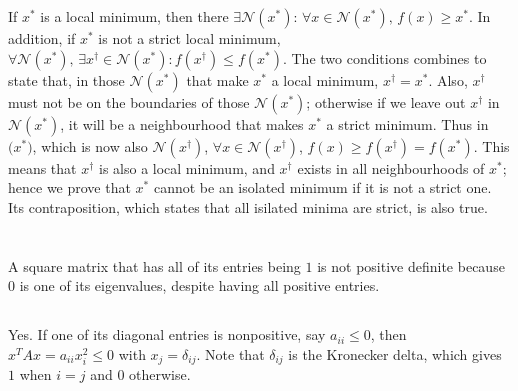 \documentclass[11pt]{article}
\begin{document}
\section{}
If $x^*$ is a local minimum, then there $\exists\mathcal{N}(x^*):\,\forall x \in\mathcal{N}(x^*),\,f(x)\geq x^*$. In addition, if $x^*$ is not a strict local minimum, $\forall \mathcal{N}(x^*),\,\exists x^\dagger\in\mathcal{N}(x^*):f(x^\dagger)\leq f(x^*) $. The two conditions combines to state that, in those $\mathcal{N}(x^*)$ that make $x^*$ a local minimum, $x^\dagger=x^*$. Also, $x^\dagger$ must not be on the boundaries of those $\mathcal{N}(x^*)$; otherwise if we leave out $x^\dagger$ in $\mathcal{N}(x^*)$, it will be a neighbourhood that makes $x^*$ a strict minimum. Thus in $\mathcal(x^*)$, which is now also $\mathcal{N}(x^\dagger)$, $\forall x\in\mathcal{N}(x^\dagger)$, $f(x) \geq f(x^\dagger)=f(x^*)$. This means that $x^\dagger$ is also a local minimum, and $x^\dagger$ exists in all neighbourhoods of $x^*$; hence we prove that $x^*$ cannot be an isolated minimum if it is not a strict one. Its contraposition, which states that all isilated minima are strict, is also true.

\section{}
\subsection{}
A square matrix that has all of its entries being $1$ is not positive definite because $0$ is one of its eigenvalues, despite having all positive entries.
\subsection{}
Yes. If one of its diagonal entries is nonpositive, say $a_{ii}\leq0$, then $x^TAx=a_{ii}x_i^2\leq0$ with $x_j=\delta_{ij}$. Note that $\delta_{ij}$ is the Kronecker delta, which gives $1$ when $i=j$ and $0$ otherwise.
\end{document}
